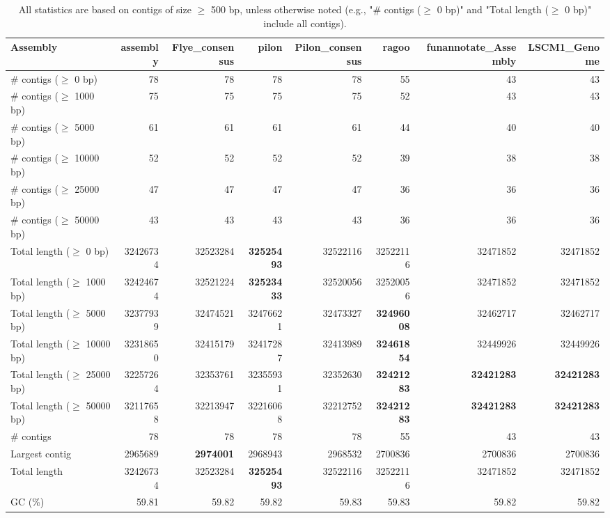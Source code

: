 \documentclass[12pt,a4paper]{article}
\begin{document}
\begin{table}[ht]
\begin{center}
\caption{All statistics are based on contigs of size $\geq$ 500 bp, unless otherwise noted (e.g., "\# contigs ($\geq$ 0 bp)" and "Total length ($\geq$ 0 bp)" include all contigs).}
\begin{tabular}{|l*{7}{|r}|}
\hline
Assembly & assembly & Flye\_consensus & pilon & Pilon\_consensus & ragoo & funannotate\_Assembly & LSCM1\_Genome \\ \hline
\# contigs ($\geq$ 0 bp) & 78 & 78 & 78 & 78 & 55 & 43 & 43 \\ \hline
\# contigs ($\geq$ 1000 bp) & 75 & 75 & 75 & 75 & 52 & 43 & 43 \\ \hline
\# contigs ($\geq$ 5000 bp) & 61 & 61 & 61 & 61 & 44 & 40 & 40 \\ \hline
\# contigs ($\geq$ 10000 bp) & 52 & 52 & 52 & 52 & 39 & 38 & 38 \\ \hline
\# contigs ($\geq$ 25000 bp) & 47 & 47 & 47 & 47 & 36 & 36 & 36 \\ \hline
\# contigs ($\geq$ 50000 bp) & 43 & 43 & 43 & 43 & 36 & 36 & 36 \\ \hline
Total length ($\geq$ 0 bp) & 32426734 & 32523284 & {\bf 32525493} & 32522116 & 32522116 & 32471852 & 32471852 \\ \hline
Total length ($\geq$ 1000 bp) & 32424674 & 32521224 & {\bf 32523433} & 32520056 & 32520056 & 32471852 & 32471852 \\ \hline
Total length ($\geq$ 5000 bp) & 32377939 & 32474521 & 32476621 & 32473327 & {\bf 32496008} & 32462717 & 32462717 \\ \hline
Total length ($\geq$ 10000 bp) & 32318650 & 32415179 & 32417287 & 32413989 & {\bf 32461854} & 32449926 & 32449926 \\ \hline
Total length ($\geq$ 25000 bp) & 32257264 & 32353761 & 32355931 & 32352630 & {\bf 32421283} & {\bf 32421283} & {\bf 32421283} \\ \hline
Total length ($\geq$ 50000 bp) & 32117658 & 32213947 & 32216068 & 32212752 & {\bf 32421283} & {\bf 32421283} & {\bf 32421283} \\ \hline
\# contigs & 78 & 78 & 78 & 78 & 55 & 43 & 43 \\ \hline
Largest contig & 2965689 & {\bf 2974001} & 2968943 & 2968532 & 2700836 & 2700836 & 2700836 \\ \hline
Total length & 32426734 & 32523284 & {\bf 32525493} & 32522116 & 32522116 & 32471852 & 32471852 \\ \hline
GC (\%) & 59.81 & 59.82 & 59.82 & 59.83 & 59.83 & 59.82 & 59.82 \\ \hline

\end{tabular}
\end{center}
\end{table}
\end{document}
